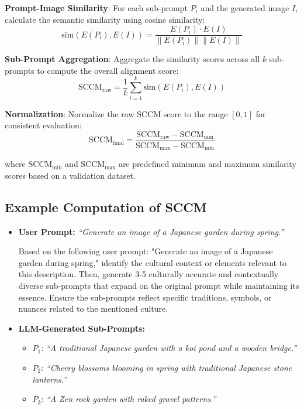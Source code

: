 \textbf{Prompt-Image Similarity}: For each sub-prompt \(P_i\) and the generated image \(I\), calculate the semantic similarity using cosine similarity:
\[
    \text{sim}(E(P_i), E(I)) = \frac{E(P_i) \cdot E(I)}{\|E(P_i)\| \|E(I)\|}
\]

\textbf{Sub-Prompt Aggregation}: Aggregate the similarity scores across all \(k\) sub-prompts to compute the overall alignment score:
\[
    \text{SCCM}_{\text{raw}} = \frac{1}{k} \sum_{i=1}^k \text{sim}(E(P_i), E(I))
\]

\textbf{Normalization}: Normalize the raw SCCM score to the range \([0, 1]\) for consistent evaluation:
\[
    \text{SCCM}_{\text{final}} = \frac{\text{SCCM}_{\text{raw}} - \text{SCCM}_{\text{min}}}{\text{SCCM}_{\text{max}} - \text{SCCM}_{\text{min}}}
\]

\noindent where \(\text{SCCM}_{\text{min}}\) and \(\text{SCCM}_{\text{max}}\) are predefined minimum and maximum similarity scores based on a validation dataset.


\subsection*{Example Computation of SCCM}
\begin{itemize}
    \item \textbf{User Prompt:} \emph{“Generate an image of a Japanese garden during spring.”}

    Based on the following user prompt: "Generate an image of a Japanese garden during spring," identify the cultural context or elements relevant to this description. Then, generate 3-5 culturally accurate and contextually diverse sub-prompts that expand on the original prompt while maintaining its essence. Ensure the sub-prompts reflect specific traditions, symbols, or nuances related to the mentioned culture.


    \item \textbf{LLM-Generated Sub-Prompts:}
    \begin{itemize}
        \item \(P_1\): \emph{“A traditional Japanese garden with a koi pond and a wooden bridge.”}
        \item \(P_2\): \emph{“Cherry blossoms blooming in spring with traditional Japanese stone lanterns.”}
        \item \(P_3\): \emph{“A Zen rock garden with raked gravel patterns.”}
    \end{itemize}
\end{itemize}

